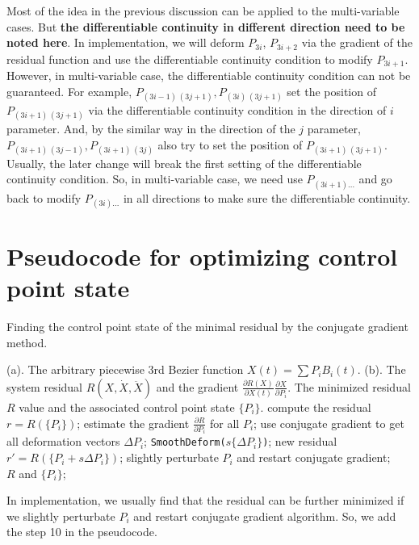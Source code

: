\documentclass[12pt]{article}
\begin{document}
Most of the idea in the previous discussion can be applied to the multi-variable cases.
But \textbf{the differentiable continuity in different direction need to be noted here}.
In implementation, we will deform $P_{3i}$, $P_{3i+2}$ via the gradient of the residual function and use the differentiable continuity condition to modify $P_{3i+1}$.
However, in multi-variable case, the differentiable continuity condition can not be guaranteed.
For example, $P_{(3i-1)\,(3j+1)},P_{(3i)\,(3j+1)}$ set the position of $P_{(3i+1)\,(3j+1)}$ via the differentiable continuity condition in the direction of $i$ parameter.
And, by the similar way in the direction of the $j$ parameter, $P_{(3i+1)\,(3j-1)},P_{(3i+1)\,(3j)}$ also try to set the position of $P_{(3i+1)\,(3j+1)}$.
Usually, the later change will break the first setting of the differentiable continuity condition.
So, in multi-variable case, we need use $P_{(3i+1)...}$ and go back to modify $P_{(3i)...}$ in all directions to make sure the differentiable continuity.





\section{Pseudocode for optimizing control point state}


\begin{algorithm}[H]
	\renewcommand{\thealgorithm}{}
	\caption{Finding the control point state of the minimal residual by the conjugate gradient method.}
	\begin{algorithmic}[1]
		\Require 
		(a). The arbitrary piecewise 3rd Bezier function $X(t)=\sum P_i B_i(t)$. \qquad\qquad  (b). The system residual $R(X,\dot{X},\ddot{X})$ and the gradient $\frac{\partial R(X)}{\partial X(t)}\frac{\partial X}{\partial P_i}$.
		\Ensure
		The minimized residual $R$ value and the associated control point state $\{P_i\}$. \vspace{2mm}
		\Repeat
			\State compute the residual $r=R(\{P_i\})$;
        	\State estimate the gradient $\frac{\partial R}{\partial P_i}$ for all $P_i$;	
			\State use conjugate gradient to get all deformation vectors $\Delta P_i$;
				\State \texttt{SmoothDeform($s \{\Delta P_i\}$)};		
				\State new residual $r'=R(\{P_i + s \Delta P_i\})$;		
		  	\EndWhile
			  \State slightly perturbate $P_i$ and restart conjugate gradient;
			\EndIf
		 \\
		\Return $R$ and $\{P_i\}$;
	\end{algorithmic}
\end{algorithm}
%
In implementation, we usually find that the residual can be further minimized if we slightly perturbate $P_i$ and restart conjugate gradient algorithm.
So, we add the step 10 in the pseudocode.
\end{document}
